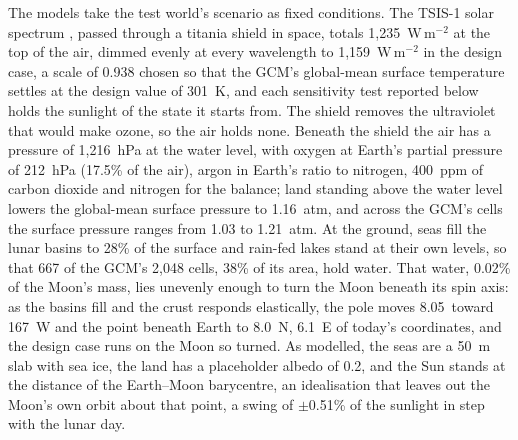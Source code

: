 The models take the test world's scenario as fixed conditions. The TSIS-1 solar spectrum
\autocite{coddington2021tsis}, passed through a titania shield in space, totals 1,235~W\,m$^{-2}$ at the top of the air, dimmed evenly at every wavelength to 1,159~W\,m$^{-2}$ in the design case, a scale of 0.938 chosen so
that the GCM's global-mean surface temperature settles at the design value of 301~K, and each sensitivity test
reported below holds the sunlight of the state it starts from. The shield removes
the ultraviolet that would make ozone, so the air holds none. Beneath the shield the air has a pressure of 1,216~hPa at the water level, with oxygen at Earth's partial pressure of 212~hPa (17.5\% of the air),
argon in Earth's ratio to nitrogen, 400~ppm of carbon dioxide and nitrogen for the balance; land standing above
the water level lowers the global-mean surface pressure to 1.16~atm, and across the GCM's cells the surface
pressure ranges from 1.03 to 1.21~atm. At the ground, seas fill the lunar basins to 28\% of the
surface and rain-fed lakes stand at their own levels, so that 667 of the GCM's 2,048 cells, 38\% of its area,
hold water. That water, 0.02\% of the Moon's mass, lies unevenly enough to turn the Moon beneath its
spin axis: as the basins fill and the crust responds elastically, the pole moves 8.05\textdegree\ toward
167\textdegree~W and the point beneath Earth to 8.0\textdegree~N, 6.1\textdegree~E of today's coordinates, and the design case runs on the Moon so
turned. As modelled, the seas are a 50~m slab with sea ice, the land has a placeholder albedo
of 0.2, and the Sun stands at the distance of the Earth--Moon barycentre, an idealisation that leaves out the Moon's own
orbit about that point, a swing of $\pm$0.51\% of the sunlight in step with the lunar day.

